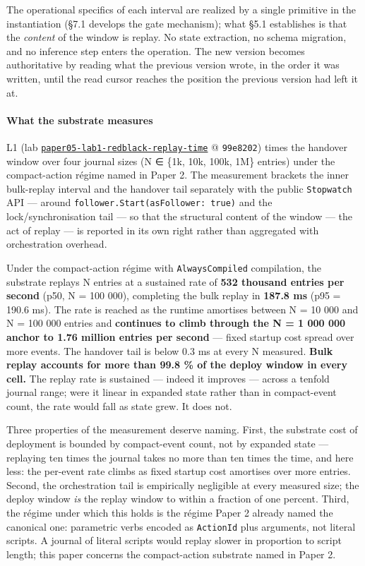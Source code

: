 \documentclass[
]{article}
\begin{document}
The operational specifics of each interval are realized by a single
primitive in the instantiation (§7.1 develops the gate mechanism); what
§5.1 establishes is that the \emph{content} of the window is replay. No
state extraction, no schema migration, and no inference step enters the
operation. The new version becomes authoritative by reading what the
previous version wrote, in the order it was written, until the read
cursor reaches the position the previous version had left it at.

\paragraph{What the substrate
measures}\label{what-the-substrate-measures}

L1 (lab
\href{data/paper05-lab1-redblack-replay-time/}{\texttt{paper05-lab1-redblack-replay-time}}
@ \texttt{99e8202}) times the handover window over four journal sizes (N
∈ \{1k, 10k, 100k, 1M\} entries) under the compact-action régime named
in Paper 2. The measurement brackets the inner bulk-replay interval and
the handover tail separately with the public \texttt{Stopwatch} API ---
around \texttt{follower.Start(asFollower:\ true)} and the
lock/synchronisation tail --- so that the structural content of the
window --- the act of replay --- is reported in its own right rather
than aggregated with orchestration overhead.

Under the compact-action régime with \texttt{AlwaysCompiled}
compilation, the substrate replays N entries at a sustained rate of
\textbf{532 thousand entries per second} (p50, N = 100 000), completing
the bulk replay in \textbf{187.8 ms} (p95 = 190.6 ms). The rate is
reached as the runtime amortises between N = 10 000 and N = 100 000
entries and \textbf{continues to climb through the N = 1 000 000 anchor
to 1.76 million entries per second} --- fixed startup cost spread over
more events. The handover tail is below 0.3 ms at every N measured.
\textbf{Bulk replay accounts for more than 99.8 \% of the deploy window
in every cell.} The replay rate is sustained --- indeed it improves ---
across a tenfold journal range; were it linear in expanded state rather
than in compact-event count, the rate would fall as state grew. It does
not.

Three properties of the measurement deserve naming. First, the substrate
cost of deployment is bounded by compact-event count, not by expanded
state --- replaying ten times the journal takes no more than ten times
the time, and here less: the per-event rate climbs as fixed startup cost
amortises over more entries. Second, the orchestration tail is
empirically negligible at every measured size; the deploy window
\emph{is} the replay window to within a fraction of one percent. Third,
the régime under which this holds is the régime Paper 2 already named
the canonical one: parametric verbs encoded as \texttt{ActionId} plus
arguments, not literal scripts. A journal of literal scripts would
replay slower in proportion to script length; this paper concerns the
compact-action substrate named in Paper 2.
\end{document}
